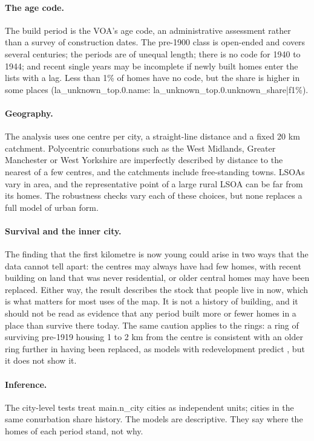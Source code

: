 \paragraph{The age code.} The build period is the VOA's age code, an administrative assessment rather than a survey of construction dates. The pre-1900 class is open-ended and covers several centuries; the periods are of unequal length; there is no code for 1940 to 1944; and recent single years may be incomplete if newly built homes enter the lists with a lag. Less than 1\% of homes have no code, but the share is higher in some places ({{la_unknown_top.0.name}}: {{la_unknown_top.0.unknown_share|f1}}\%).

\paragraph{Geography.} The analysis uses one centre per city, a straight-line distance and a fixed 20 km catchment. Polycentric conurbations such as the West Midlands, Greater Manchester or West Yorkshire are imperfectly described by distance to the nearest of a few centres, and the catchments include free-standing towns. LSOAs vary in area, and the representative point of a large rural LSOA can be far from its homes. The robustness checks vary each of these choices, but none replaces a full model of urban form.

\paragraph{Survival and the inner city.} The finding that the first kilometre is now young could arise in two ways that the data cannot tell apart: the centres may always have had few homes, with recent building on land that was never residential, or older central homes may have been replaced. Either way, the result describes the stock that people live in now, which is what matters for most uses of the map. It is not a history of building, and it should not be read as evidence that any period built more or fewer homes in a place than survive there today. The same caution applies to the rings: a ring of surviving pre-1919 housing 1 to 2 km from the centre is consistent with an older ring further in having been replaced, as models with redevelopment predict \citep{wheaton1982}, but it does not show it.

\paragraph{Inference.} The city-level tests treat {{main.n_city}} cities as independent units; cities in the same conurbation share history. The models are descriptive. They say where the homes of each period stand, not why.

